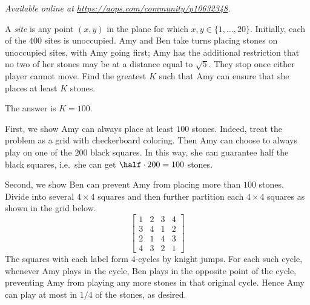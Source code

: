 \textsl{Available online at \url{https://aops.com/community/p10632348}.}
\begin{mdframed}[style=mdpurplebox,frametitle={Problem statement}]
A \emph{site} is any point $(x,y)$ in the plane
for which $x,y \in \{1, \dots, 20\}$.
Initially, each of the $400$ sites is unoccupied.
Amy and Ben take turns placing stones on unoccupied sites,
with Amy going first;
Amy has the additional restriction that no two of her stones
may be at a distance equal to $\sqrt5$.
They stop once either player cannot move.
Find the greatest $K$ such that Amy can ensure that
she places at least $K$ stones.
\end{mdframed}
The answer is $K = 100$.

First, we show Amy can always place at least $100$ stones.
Indeed, treat the problem as a grid with checkerboard coloring.
Then Amy can choose to always play on one of the $200$ black squares.
In this way, she can guarantee half the black squares,
i.e.\ she can get $\half \cdot 200 = 100$ stones.

Second, we show Ben can prevent Amy from placing more than $100$ stones.
Divide into several $4 \times 4$ squares and then further partition
each $4 \times 4$ squares as shown in the grid below.
\[
  \left[
  \begin{array}{cccc}
    1 & 2 & 3 & 4 \\
    3 & 4 & 1 & 2 \\
    2 & 1 & 4 & 3 \\
    4 & 3 & 2 & 1
  \end{array}
  \right]
\]
The squares with each label form $4$-cycles by knight jumps.
For each such cycle, whenever Amy plays in the cycle,
Ben plays in the opposite point of the cycle,
preventing Amy from playing any more stones in that original cycle.
Hence Amy can play at most in $1/4$ of the stones, as desired.
\pagebreak